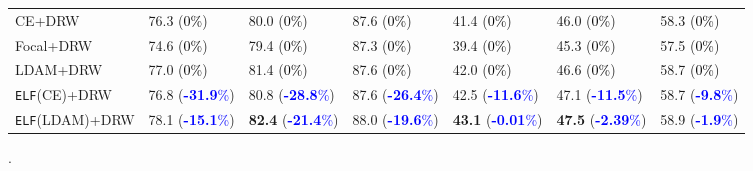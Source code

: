 \documentclass{article}
\newcommand{\method}{\texttt{ELF}\xspace}
\begin{document}
\begin{table*}[t]
\begin{tabular}{lllllll}
\midrule
CE+\scriptsize{DRW}~\cite{cui2019class} & 76.3 \scriptsize{(\textcolor{black}{0\%})} & 80.0 \scriptsize{(\textcolor{black}{0\%})} & 87.6 \scriptsize{(\textcolor{black}{0\%})}& 41.4 \scriptsize{(\textcolor{black}{0\%})}& 46.0 \scriptsize{(\textcolor{black}{0\%})}&  58.3 \scriptsize{(\textcolor{black}{0\%})}\\Focal+\scriptsize{DRW}~\cite{lin2017focal} & 74.6 \scriptsize{(\textcolor{black}{0\%})}& 79.4 \scriptsize{(\textcolor{black}{0\%})}&  87.3 \scriptsize{(\textcolor{black}{0\%})}& 39.4 \scriptsize{(\textcolor{black}{0\%})}& 45.3 \scriptsize{(\textcolor{black}{0\%})}&  57.5 \scriptsize{(\textcolor{black}{0\%})}\\LDAM+\scriptsize{DRW}~\cite{cao2019learning} & 77.0 \scriptsize{(\textcolor{black}{0\%})}& 81.4 \scriptsize{(\textcolor{black}{0\%})}&  87.6 \scriptsize{(\textcolor{black}{0\%})}& 42.0 \scriptsize{(\textcolor{black}{0\%})}& 46.6 \scriptsize{(\textcolor{black}{0\%})}&  58.7 \scriptsize{(\textcolor{black}{0\%})}\\\midrule
\method{}{\scriptsize (CE)}+\scriptsize{DRW}  & 76.8 \scriptsize{(\textcolor{blue}{\textbf{-31.9}\%})} & 80.8 \scriptsize{(\textcolor{blue}{\textbf{-28.8}\%})} &  87.6 \scriptsize{(\textcolor{blue}{\textbf{-26.4}\%})} & 42.5 \scriptsize{(\textcolor{blue}{\textbf{-11.6}\%})} & 47.1 \scriptsize{(\textcolor{blue}{\textbf{-11.5}\%})} & 58.7 \scriptsize{(\textcolor{blue}{\textbf{-9.8}\%})} \\

\method{}{\scriptsize (LDAM)}+\scriptsize{DRW}  & 78.1 \scriptsize{(\textcolor{blue}{\textbf{-15.1}\%})} & \textbf{82.4} \scriptsize{(\textcolor{blue}{\textbf{-21.4}\%})} &  88.0 \scriptsize{(\textcolor{blue}{\textbf{-19.6}\%})} & \textbf{43.1} \scriptsize{(\textcolor{blue}{\textbf{-0.01}\%})} & \textbf{47.5}  \scriptsize{(\textcolor{blue}{\textbf{-2.39}\%})} & 58.9 \scriptsize{(\textcolor{blue}{\textbf{-1.9}\%})} \\



\bottomrule     
\end{tabular}
\caption{Top-1 accuracy for ResNet-32 models trained on long tailed CIFAR-10 and CIFAR-100 datasets. 
Numbers in parentheses indicate the FLOPS expended relative to the baseline model CE (i.e., more \textcolor{blue}{\textit{negative}} means more savings, thus better). Notice that BBN outperforms \method in some scenarios. This is not surprising since it uses double the number of FLOPS compared to all other methods. These results are referenced from \cite{zhou2019bbn}. 
}.
\label{tab:cifar_experiments}

\end{table*} 
\end{document}
